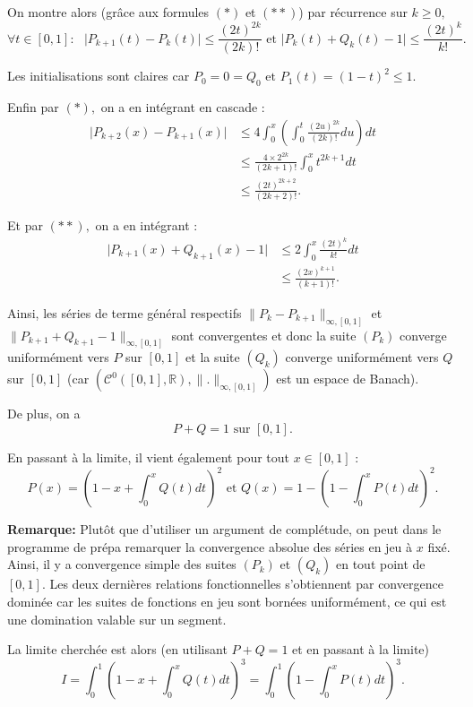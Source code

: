 On montre alors (grâce aux formules $(*)$ et $(**)$) par récurrence sur $k\geq 0,$ $$\forall t\in[0,1] :\mbox{ } \vert P_{k+1}(t)-P_{k}(t)\vert\leq \frac{(2t)^{2k}}{(2k)!}  \mbox{ et } \vert P_{k}(t)+Q_{k}(t)-1\vert \leq \frac{(2t)^{k}}{k!}.$$

Les initialisations sont claires car $\displaystyle P_{0}=0=Q_{0} \mbox{ et } P_{1}(t)=(1-t)^{2}\leq 1.$

Enfin par $(*),$ on a en intégrant en cascade :
\begin{align*}
\vert P_{k+2}(x)-P_{k+1}(x)\vert  & \leq 4\int_{0}^{x}\left(\int_{0}^{t}\frac{(2u)^{2k}}{(2k)!}du\right)dt\\
& \leq \frac{4\times 2^{2k}}{(2k+1)!}\int_{0}^{x}t^{2k+1}dt\\
& \leq \frac{(2t)^{2k+2}}{(2k+2)!}.
\end{align*}

Et par $(**),$ on a en intégrant :
\begin{align*}
\vert P_{k+1}(x)+Q_{k+1}(x)-1\vert & \leq 2\int_{0}^{x}\frac{(2t)^{k}}{k!}dt\\
& \leq \frac{(2x)^{k+1}}{(k+1)!}.
\end{align*}

Ainsi, les séries de terme général respectifs $\displaystyle \|P_{k}-P_{k+1}\|_{\infty,[0,1]}$ et  $\displaystyle \|P_{k+1}+Q_{k+1}-1\|_{\infty,[0,1]}$  sont convergentes et donc la suite $(P_{k})$ converge uniformément vers $P$ sur $[0,1]$ et la suite  $(Q_{k})$ converge uniformément vers $Q$ sur $[0,1]$ (car $\displaystyle \left(\mathcal{C}^{0}([0,1],\mathbb{R}),\|.\|_{\infty,[0,1]}\right)$ est un espace de Banach). 

De plus, on a $$ P+Q=1 \mbox{ sur } [0,1].$$

En passant à la limite, il vient également pour tout $x\in[0,1]$ : $$\displaystyle P(x)=\left(1-x+\int_{0}^{x}Q(t)dt\right)^{2} \mbox{ et } Q(x)=1-\left(1-\int_{0}^{x}P(t)dt\right)^{2}.$$

\textbf{Remarque: } Plutôt que d'utiliser un argument de complétude, on peut dans le programme de prépa remarquer la convergence absolue des séries en jeu à $x$ fixé. Ainsi, il y a convergence simple des suites $(P_{k})$ et $(Q_{k})$ en tout point de $[0,1].$ Les deux dernières relations fonctionnelles s'obtiennent par convergence dominée car les suites de fonctions en jeu sont bornées uniformément, ce qui est une domination valable sur un segment.

La limite cherchée est alors (en utilisant $P+Q=1$ et en passant à la limite) $$ I=\int_{0}^{1}\left(1-x+\int_{0}^{x}Q(t)dt\right)^{3}=\int_{0}^{1}\left(1-\int_{0}^{x}P(t)dt\right)^{3}.$$

